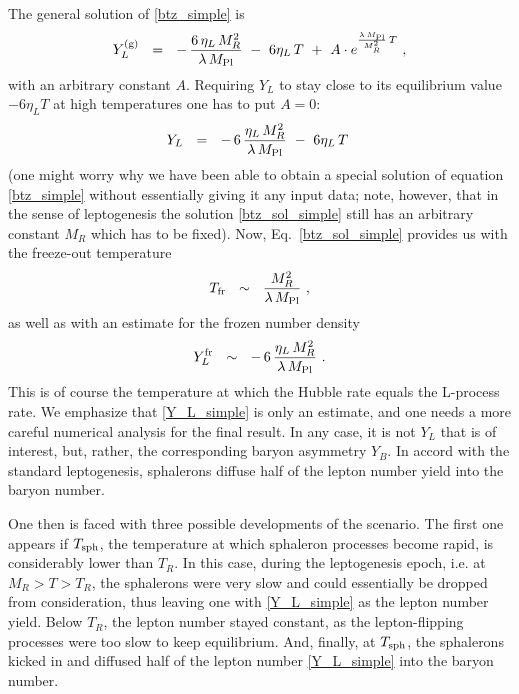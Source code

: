 \documentclass[12pt]{revtex4}
\newcommand{\Mpl}{M_{\rm Pl}}
\newcommand{\Tfr}{T_{\rm fr}}
\newcommand{\Tsph}{T_{\rm sph}}
\begin{document}
	The general solution of \eqref{btz_simple} is
\[
	Y_L^{(\rm g)} ~~=~~ -\,\frac{6\,\eta_L\,M_R^2}{\lambda\,\Mpl}
		~-~ 6\eta_L\,T ~+~
		A\cdot e^{\frac{\lambda\, \Mpl}{M_R^2}\, T}~,
\]
	with an arbitrary constant $ A $.
	Requiring $ Y_L $ to stay close to its equilibrium value 
	$ - 6\eta_L T $ at high temperatures one has to 
	put $ A = 0 $:
\begin{equation}
\label{btz_sol_simple}
	Y_L ~~=~~ -\,6\,\frac{\eta_L\,M_R^2}{\lambda\,\Mpl}
		~-~ 6\eta_L\,T ~
\end{equation}
	(one might worry why we have been able to obtain a special
	solution of equation \eqref{btz_simple} without essentially giving it
	any input data; note, however, that in the sense of leptogenesis
	the solution \eqref{btz_sol_simple} still has an arbitrary
	constant $ M_R $ which has to be fixed).
	Now, Eq.~\eqref{btz_sol_simple} provides us with the freeze-out
	temperature
\begin{equation}
\label{T_R}
	\Tfr ~~\sim~~ \frac{M_R^2}{\lambda\,\Mpl}~,
\end{equation}
	as well as with an estimate for the frozen number density
\begin{equation}
\label{Y_L_simple}
	Y_L^{\rm fr} ~~\sim~~ -\, 6\,\frac{\eta_L\,M_R^2}{\lambda\,\Mpl}~.
\end{equation}
	This is of course the temperature at which the Hubble rate equals 
	the L-process rate.
	We emphasize that \eqref{Y_L_simple} is only an estimate, 
	and one needs a more careful numerical analysis for the final
	result.
	In any case, it is not $ Y_L $ that is of interest, but, rather,
	the corresponding baryon asymmetry $ Y_B $.
	In accord with the standard leptogenesis, sphalerons diffuse
	half of the lepton number yield into the baryon number.


	One then is faced with three possible developments of the scenario.
	The first one appears if $ \Tsph $, the temperature at which
	sphaleron processes become rapid, is considerably lower than $ T_R $.
	In this case, during the leptogenesis epoch, 
	i.e. at $ M_R > T > T_R $,
	the sphalerons were very slow and could essentially be dropped 
	from consideration,
	thus leaving one with \eqref{Y_L_simple} as the lepton number yield.
	Below $ T_R $, the lepton number stayed constant, as the 
	lepton-flipping processes were too slow to keep equilibrium.
	And, finally, at $ \Tsph $, the sphalerons kicked in and diffused
	half of the lepton number \eqref{Y_L_simple} into the baryon number.
\end{document}
